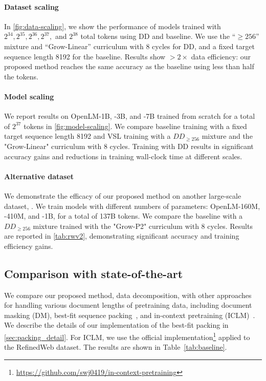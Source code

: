 \paragraph{Dataset scaling} In \cref{fig:data-scaling}, we show the performance of models trained with $2^{34}, 2^{35}, 2^{36}, 2^{37},$ and $2^{38}$ total tokens using DD and baseline. We use the “$\ge 256$” mixture and “Grow-Linear” curriculum with 8 cycles for DD, and a fixed target sequence length 8192 for the baseline. Results show $>2\times$ data efficiency: our proposed method reaches the same accuracy as the baseline using less than half the tokens.

\vspace*{-10pt}
\paragraph{Model scaling}
We report results on OpenLM-1B, -3B, and -7B trained from scratch for a total of $2^{37}$ tokens in \cref{fig:model-scaling}. We compare baseline training with a fixed target sequence length 8192 and VSL training with a $DD_{\ge 256}$ mixture and the "Grow-Linear" curriculum with 8 cycles. Training with DD results in significant accuracy gains and reductions in training wall-clock time at different scales.


\vspace*{-10pt}
\paragraph{Alternative dataset} We demonstrate the efficacy of our proposed method on another large-scale dataset, . 
We train models with different numbers of parameters: OpenLM-160M, -410M, and -1B, for a total of 137B tokens. We compare the baseline with a $DD_{\ge 256}$ mixture trained with the "Grow-P2" curriculum with 8 cycles. Results are reported in \cref{tab:rwv2}, demonstrating significant accuracy and training efficiency gains. 

\subsection{Comparison with state-of-the-art}\label{sec:sota}
We compare our proposed method, data decomposition, with other approaches for handling various document lengths of pretraining data, including document masking (DM), best-fit sequence packing~\citep{ding2024fewer}, and in-context pretraining (ICLM)~\citep{shi2023context}. We describe the details of our implementation of the best-fit packing in \cref{sec:packing_detail}. For ICLM, we use the official implementation\footnote{\url{https://github.com/swj0419/in-context-pretraining}} applied to the RefinedWeb dataset. The results are shown in Table~\ref{tab:baseline}.

